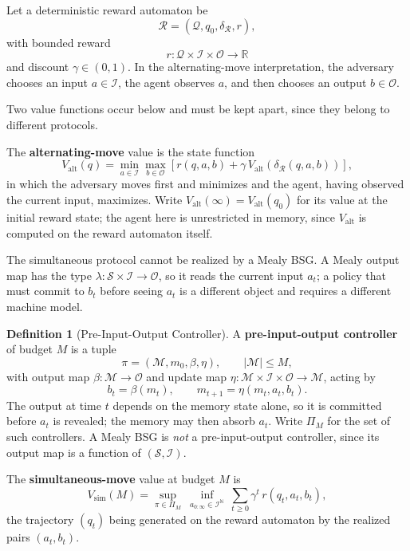 \documentclass[12pt]{article}
\theoremstyle{definition}
\newtheorem{definition}[theorem]{Definition}
\newcommand{\Valt}{V_{\mathrm{alt}}}
\newcommand{\Vsim}{V_{\mathrm{sim}}}
\begin{document}
Let a deterministic reward automaton be
\[
\mathcal R=(\mathcal Q,q_0,\delta_{\mathcal R},r),
\]
with bounded reward
\[
r:\mathcal Q\times\mathcal I\times\mathcal O\to\mathbb R
\]
and discount $\gamma\in(0,1)$.  In the alternating-move interpretation, the
adversary chooses an input $a\in\mathcal I$, the agent observes $a$, and then
chooses an output $b\in\mathcal O$.

Two value functions occur below and must be kept apart, since they belong to
different protocols.

The \textbf{alternating-move} value is the state function
\[
\Valt(q)
=
\min_{a\in\mathcal I}
\max_{b\in\mathcal O}
\left[
r(q,a,b)+\gamma\,\Valt(\delta_{\mathcal R}(q,a,b))
\right],
\]
in which the adversary moves first and minimizes and the agent, having observed
the current input, maximizes.  Write $\Valt(\infty)=\Valt(q_0)$ for its value
at the initial reward state; the agent here is unrestricted in memory, since
$\Valt$ is computed on the reward automaton itself.

The simultaneous protocol cannot be realized by a Mealy BSG.  A Mealy output
map has the type $\lambda:\mathcal S\times\mathcal I\to\mathcal O$, so it reads
the current input $a_t$; a policy that must commit to $b_t$ before seeing
$a_t$ is a different object and requires a different machine model.

\begin{definition}[Pre-Input-Output Controller]
\label{def:pio-controller}
A \textbf{pre-input-output controller} of budget $M$ is a tuple
\[
\pi=(\mathcal M,m_0,\beta,\eta),
\qquad
|\mathcal M|\le M,
\]
with output map $\beta:\mathcal M\to\mathcal O$ and update map
$\eta:\mathcal M\times\mathcal I\times\mathcal O\to\mathcal M$, acting by
\[
b_t=\beta(m_t),
\qquad
m_{t+1}=\eta(m_t,a_t,b_t).
\]
The output at time $t$ depends on the memory state alone, so it is committed
before $a_t$ is revealed; the memory may then absorb $a_t$.  Write $\Pi_M$ for
the set of such controllers.  A Mealy BSG is \emph{not} a pre-input-output
controller, since its output map is a function of $(\mathcal S,\mathcal I)$.
\end{definition}

The \textbf{simultaneous-move} value at budget $M$ is
\[
\Vsim(M)
=
\sup_{\pi\in\Pi_M}
\ \inf_{a_{0:\infty}\in\mathcal I^{\mathbb N}}
\ \sum_{t\ge0}\gamma^t\,r(q_t,a_t,b_t),
\]
the trajectory $(q_t)$ being generated on the reward automaton by the realized
pairs $(a_t,b_t)$.
\end{document}
